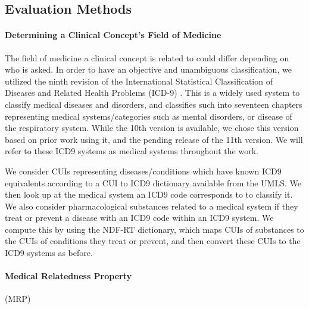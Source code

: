 \documentclass[10pt]{article}
\begin{document}


\subsection{Evaluation Methods}

\paragraph{Determining a Clinical Concept's Field of Medicine}
The field of medicine a clinical concept is related to could differ depending on who is asked. In order to have an objective and unambiguous classification, we utilized the ninth revision of the International Statistical Classification of Diseases and Related Health Problems (ICD-9) \cite{sleeInternationalClassificationDiseases1978}. This is a widely used system to classify medical diseases and disorders, and classifies such into seventeen chapters representing medical systems/categories such as mental disorders, or disease of the respiratory system. While the 10th version is available, we chose this version based on prior work using it, and the pending release of the 11th version. We will refer to these ICD9 systems as medical systems throughout the work. 

We consider CUIs representing diseases/conditions which have known ICD9 equivalents according to a CUI to ICD9 dictionary available from the UMLS. We then look up at the medical system an ICD9 code corresponds to to classify it. We also consider pharmacological substances related to a medical system if they treat or prevent a disease with an ICD9 code within an ICD9 system. We compute this by using the NDF-RT dictionary, which maps CUIs of substances to the CUIs of conditions they treat or prevent, and then convert these CUIs to the ICD9 systems as before.  

\paragraph{Medical Relatedness Property}(MRP)
\end{document}
